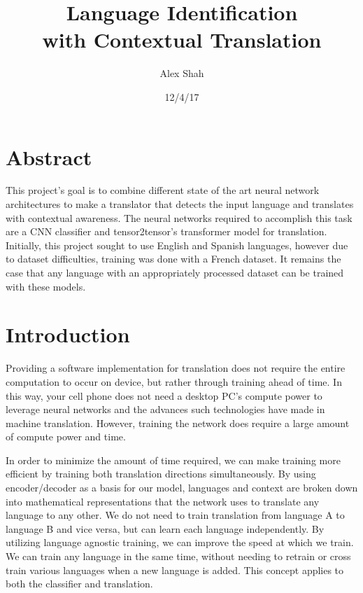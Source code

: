 \documentclass[10pt,a4paper]{article}
\begin{document}
\title{Language Identification \\ with Contextual Translation}
\author{Alex Shah}
\date{12/4/17}


\maketitle


\section{Abstract}


This project's goal is to combine different state of the art neural network architectures to make a translator that detects the input language and translates with contextual awareness. The neural networks required to accomplish this task are a CNN classifier and tensor2tensor's transformer model for translation. Initially, this project sought to use English and Spanish languages, however due to dataset difficulties, training was done with a French dataset. It remains the case that any language with an appropriately processed dataset can be trained with these models.


\section{Introduction}


Providing a software implementation for translation does not require the entire computation to occur on device, but rather through training ahead of time. In this way, your cell phone does not need a desktop PC's compute power to leverage neural networks and the advances such technologies have made in machine translation. However, training the network does require a large amount of compute power and time.


In order to minimize the amount of time required, we can make training more efficient by training both translation directions simultaneously. By using encoder/decoder as a basis for our model, languages and context are broken down into mathematical representations that the network uses to translate any language to any other. We do not need to train translation from language A to language B and vice versa, but can learn each language independently. By utilizing language agnostic training, we can improve the speed at which we train. We can train any language in the same time, without needing to retrain or cross train various languages when a new language is added. This concept applies to both the classifier and translation.
\end{document}
